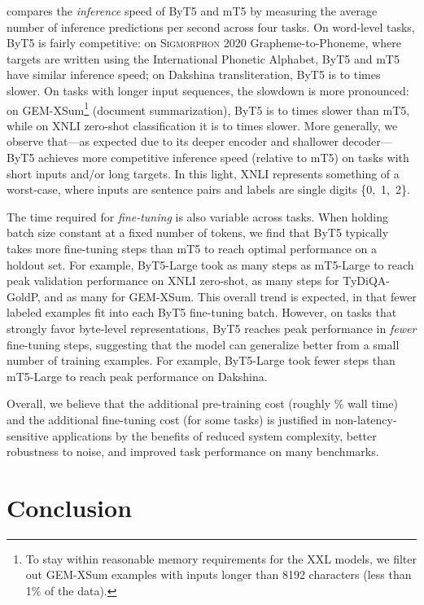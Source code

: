\documentclass[11pt,a4paper]{article}
\begin{document}
 compares the \textit{inference} speed of ByT5 and mT5 by measuring the average number of inference predictions per second across four tasks. On word-level tasks, ByT5 is fairly competitive: on \textsc{Sigmorphon} 2020 Grapheme-to-Phoneme, where targets are written using the International Phonetic Alphabet, ByT5 and mT5 have similar inference speed; on Dakshina transliteration, ByT5 is  to  times slower. On tasks with longer input sequences, the slowdown is more pronounced: on \mbox{GEM-XSum}\footnote{To stay within reasonable memory requirements for the XXL models, we filter out \mbox{GEM-XSum} examples with inputs longer than 8192 characters (less than 1\% of the data).} (document summarization), ByT5 is  to  times slower than mT5, while on XNLI zero-shot classification it is  to  times slower. More generally, we observe that---as expected due to its deeper encoder and shallower decoder---ByT5 achieves more competitive inference speed (relative to mT5) on tasks with short inputs and/or long targets. In this light, XNLI represents something of a worst-case, where inputs are sentence pairs and labels are single digits \{0,~1,~2\}.

The time required for \textit{fine-tuning} is also variable across tasks. When holding batch size constant at a fixed number of tokens, we find that ByT5 typically takes more fine-tuning steps than mT5 to reach optimal performance on a holdout set. For example, ByT5-Large took  as many steps as mT5-Large to reach peak validation performance on XNLI zero-shot,  as many steps for TyDiQA-GoldP, and  as many for \mbox{GEM-XSum}. This overall trend is expected, in that fewer labeled examples fit into each ByT5 fine-tuning batch. However, on tasks that strongly favor byte-level representations, ByT5 reaches peak performance in \emph{fewer} fine-tuning steps, suggesting that the model can generalize better from a small number of training examples. For example, ByT5-Large took  fewer steps than mT5-Large to reach peak performance on Dakshina.

Overall, we believe that the additional pre-training cost (roughly \% wall time) and the additional fine-tuning cost (for some tasks) is justified in non-latency-sensitive applications by the benefits of reduced system complexity, better robustness to noise, and improved task performance on many benchmarks.

\section{Conclusion}
\label{sec:conclusion}
\end{document}
